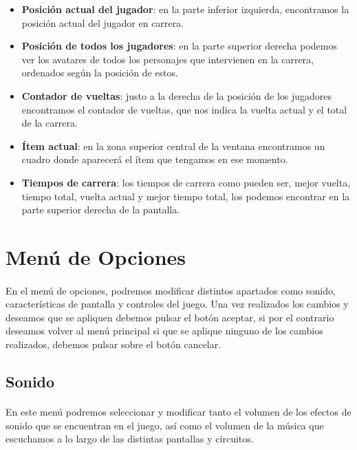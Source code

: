 \begin{itemize}
    \item \textbf{Posición actual del jugador}: en la parte inferior izquierda, encontramos la posición actual del 
    jugador en carrera.
    
    \item \textbf{Posición de todos los jugadores}: en la parte superior derecha podemos ver los avatares de todos los personajes
    que intervienen en la carrera, ordenados según la posición de estos.
    
    \item \textbf{Contador de vueltas}: justo a la derecha de la posición de los jugadores encontramos el
    contador de vueltas, que nos indica la vuelta actual y el total de la carrera.
    
    \item \textbf{Ítem actual}: en la zona superior central de la ventana encontramos un cuadro donde aparecerá el ítem que tengamos
    en ese momento.
    
    \item \textbf{Tiempos de carrera}: los tiempos de carrera como pueden ser, mejor vuelta, tiempo total, vuelta actual y mejor 
    tiempo total, los podemos encontrar en la parte superior derecha de la pantalla.
\end{itemize}

\section{Menú de Opciones}

\paragraph{}
En el menú de opciones, podremos modificar distintos apartados como sonido, características de pantalla y controles del juego. 
Una vez realizados los cambios y deseamos que se apliquen debemos pulsar el botón aceptar, si por el contrario deseamos volver al
menú principal si que se aplique ninguno de los cambios realizados, debemos pulsar sobre el botón cancelar.

\subsection{Sonido}

\paragraph{}
En este menú podremos seleccionar y modificar tanto el volumen de los efectos de sonido que se encuentran en el juego, así 
como el volumen de la música que escuchamos a lo largo de las distintas pantallas y circuitos.


